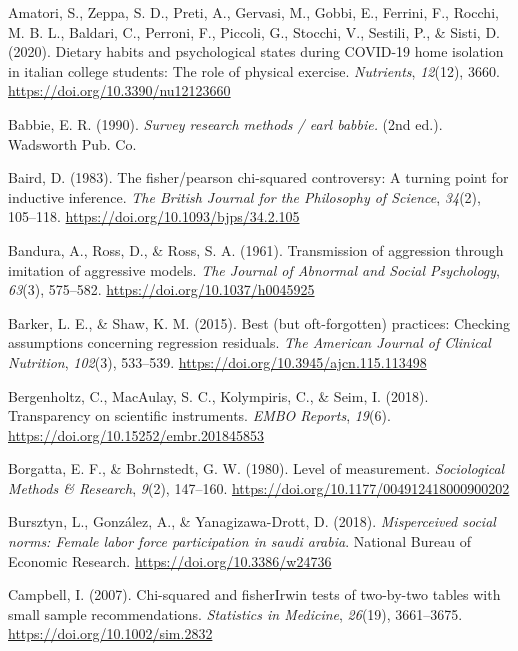 \documentclass[
]{book}
\begin{document}
\leavevmode\hypertarget{ref-Amatori2020}{}%
Amatori, S., Zeppa, S. D., Preti, A., Gervasi, M., Gobbi, E., Ferrini,
F., Rocchi, M. B. L., Baldari, C., Perroni, F., Piccoli, G., Stocchi,
V., Sestili, P., \& Sisti, D. (2020). Dietary habits and psychological
states during COVID-19 home isolation in italian college students: The
role of physical exercise. \emph{Nutrients}, \emph{12}(12), 3660.
\url{https://doi.org/10.3390/nu12123660}

\leavevmode\hypertarget{ref-BabbieEarlR1990}{}%
Babbie, E. R. (1990). \emph{Survey research methods / earl babbie.} (2nd
ed.). Wadsworth Pub. Co.

\leavevmode\hypertarget{ref-BAIRD1983}{}%
Baird, D. (1983). The fisher/pearson chi-squared controversy: A turning
point for inductive inference. \emph{The British Journal for the
Philosophy of Science}, \emph{34}(2), 105--118.
\url{https://doi.org/10.1093/bjps/34.2.105}

\leavevmode\hypertarget{ref-Bandura1961}{}%
Bandura, A., Ross, D., \& Ross, S. A. (1961). Transmission of aggression
through imitation of aggressive models. \emph{The Journal of Abnormal
and Social Psychology}, \emph{63}(3), 575--582.
\url{https://doi.org/10.1037/h0045925}

\leavevmode\hypertarget{ref-Barker2015}{}%
Barker, L. E., \& Shaw, K. M. (2015). Best (but oft-forgotten)
practices: Checking assumptions concerning regression residuals.
\emph{The American Journal of Clinical Nutrition}, \emph{102}(3),
533--539. \url{https://doi.org/10.3945/ajcn.115.113498}

\leavevmode\hypertarget{ref-Bergenholtz2018}{}%
Bergenholtz, C., MacAulay, S. C., Kolympiris, C., \& Seim, I. (2018).
Transparency on scientific instruments. \emph{EMBO Reports},
\emph{19}(6). \url{https://doi.org/10.15252/embr.201845853}

\leavevmode\hypertarget{ref-Borgatta1980}{}%
Borgatta, E. F., \& Bohrnstedt, G. W. (1980). Level of measurement.
\emph{Sociological Methods \& Research}, \emph{9}(2), 147--160.
\url{https://doi.org/10.1177/004912418000900202}

\leavevmode\hypertarget{ref-Bursztyn2018}{}%
Bursztyn, L., González, A., \& Yanagizawa-Drott, D. (2018).
\emph{Misperceived social norms: Female labor force participation in
saudi arabia}. National Bureau of Economic Research.
\url{https://doi.org/10.3386/w24736}

\leavevmode\hypertarget{ref-Campbell2007}{}%
Campbell, I. (2007). Chi-squared and fisherIrwin tests of two-by-two
tables with small sample recommendations. \emph{Statistics in Medicine},
\emph{26}(19), 3661--3675. \url{https://doi.org/10.1002/sim.2832}
\end{document}
